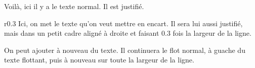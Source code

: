 \documentclass[12pt]{article}
\begin{document}
Voilà, ici il y a le texte normal. Il est justifié.
\begin{wrapfigure}{r}{0.3\textwidth}
Ici, on met le texte qu'on veut mettre en encart.
Il sera lui aussi justifié, mais dans un petit cadre
aligné à droite et faisant 0.3 fois la largeur de la ligne.
\end{wrapfigure}
On peut ajouter à nouveau du texte.
Il continuera le flot normal, à guache du texte flottant,
puis à nouveau sur toute la largeur de la ligne.
\end{document}
